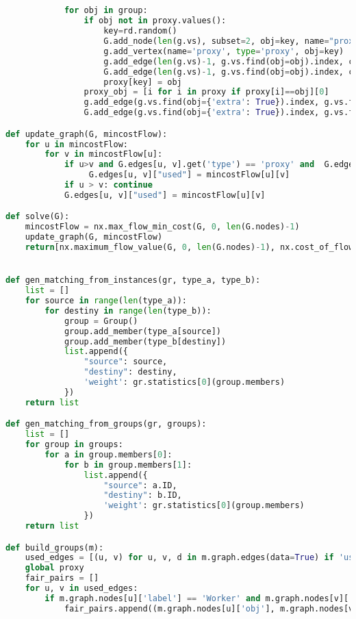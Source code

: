 \begin{apendicesenv}
\begin{lstlisting}[language=Python, caption={Fair Bipartite Matching Solver Source Code}]
                        

            
            for obj in group:
                if obj not in proxy.values():
                    key=rd.random()
                    G.add_node(len(g.vs), subset=2, obj=key, name="proxy", label='proxy')
                    g.add_vertex(name='proxy', type='proxy', obj=key)
                    g.add_edge(len(g.vs)-1, g.vs.find(obj=obj).index, capacity=1, weight=0, type='proxy')
                    G.add_edge(len(g.vs)-1, g.vs.find(obj=obj).index, capacity=1, weight=0, type='proxy')
                    proxy[key] = obj
                proxy_obj = [i for i in proxy if proxy[i]==obj][0]
                g.add_edge(g.vs.find(obj={'extra': True}).index, g.vs.find(obj=proxy_obj).index, capacity=1, weight=0)
                G.add_edge(g.vs.find(obj={'extra': True}).index, g.vs.find(obj=proxy_obj).index, capacity=1, weight=0)

def update_graph(G, mincostFlow):
    for u in mincostFlow:
        for v in mincostFlow[u]:
            if u>v and G.edges[u, v].get('type') == 'proxy' and  G.edges[u, v]["used"]==0:
                 G.edges[u, v]["used"] = mincostFlow[u][v]
            if u > v: continue
            G.edges[u, v]["used"] = mincostFlow[u][v]

def solve(G):
    mincostFlow = nx.max_flow_min_cost(G, 0, len(G.nodes)-1)
    update_graph(G, mincostFlow)
    return[nx.maximum_flow_value(G, 0, len(G.nodes)-1), nx.cost_of_flow(G, mincostFlow)]


def gen_matching_from_instances(gr, type_a, type_b):
    list = []
    for source in range(len(type_a)):
        for destiny in range(len(type_b)):
            group = Group()
            group.add_member(type_a[source])
            group.add_member(type_b[destiny])
            list.append({
                "source": source,
                "destiny": destiny,
                'weight': gr.statistics[0](group.members)
            })
    return list

def gen_matching_from_groups(gr, groups):
    list = []
    for group in groups:
        for a in group.members[0]:
            for b in group.members[1]:
                list.append({
                    "source": a.ID,
                    "destiny": b.ID,
                    'weight': gr.statistics[0](group.members)
                })
    return list

def build_groups(m):
    used_edges = [(u, v) for u, v, d in m.graph.edges(data=True) if 'used' in d and d['used'] > 0]
    global proxy
    fair_pairs = []
    for u, v in used_edges:
        if m.graph.nodes[u]['label'] == 'Worker' and m.graph.nodes[v]['label'] == 'Job':
            fair_pairs.append((m.graph.nodes[u]['obj'], m.graph.nodes[v]['obj']))


\end{lstlisting}
\end{apendicesenv}
